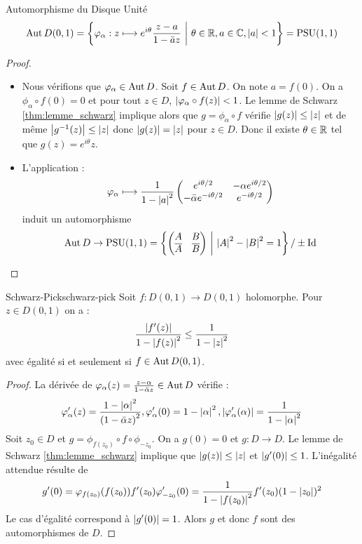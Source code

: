 \documentclass{cours}
\begin{document}
\begin{théorème}{Automorphisme du Disque Unité}{}
    \[
        \operatorname{Aut} D(0, 1) = \left\{\varphi_{\alpha} : z \longmapsto e^{i\theta}\frac{z - a}{1 - \bar{a}z}\ \middle|\ \theta \in \mathbb{R}, a \in \mathbb{C}, \left|a\right| < 1\right\} = {\rm PSU}(1, 1)
    \]
\end{théorème}
\begin{proof}
    \begin{itemize}
        \item Nous vérifions que $\varphi_{\alpha} \in \operatorname{Aut} D$. Soit $f \in \operatorname{Aut} D$. On note $a = f(0)$. On a $\phi_{\alpha} \circ f(0) = 0$ et pour tout $z \in D$, $\left|\varphi_{\alpha} \circ f(z)\right| < 1$. Le lemme de Schwarz \ref{thm:lemme_schwarz} implique alors que $g = \phi_{\alpha} \circ f$ vérifie $\left|g(z)\right| \leq \left|z\right|$ et de même $\left|g^{-1}(z)\right| \leq \left|z\right|$ donc $\left|g(z)\right| = \left|z\right|$ pour $z\in D$. Donc il existe $\theta \in \mathbb{R}$ tel que $g(z) = e^{i\theta}z$.
        \item L'application : 
        \[
            \varphi_{\alpha}\longmapsto \frac{1}{1- \left|a\right|^{2}}\begin{pmatrix}
                e^{i\theta/2} & -\alpha e^{i\theta/2} \\
                -\bar{\alpha}e^{-i\theta/2} & e^{-i\theta/2}
            \end{pmatrix}
        \]
        induit un automorphisme 
        \[
            \operatorname{Aut} D \rightarrow {\rm PSU}(1, 1) = \left\{\begin{pmatrix}
                A & B \\ \overline{A} & \overline{B}
            \end{pmatrix}\ \middle| \ \left|A\right|^{2} - \left|B\right|^{2} = 1\right\}/\pm {\rm Id}
        \]
    \end{itemize}
\end{proof}
\begin{corollaire}{Schwarz-Pick}{schwarz-pick}
    Soit $f : D(0, 1) \to D(0, 1)$ holomorphe. Pour $z \in D(0, 1)$ on a :
    \[
        \frac{\left|f'(z)\right|}{1 - \left|f(z)\right|^{2}} \leq \frac{1}{1 - \left|z\right|^{2}}
    \]
    avec égalité si et seulement si $f \in \operatorname{Aut} D(0, 1)$.
\end{corollaire}
\begin{proof}
    La dérivée de $\varphi_{\alpha}(z) = \frac{z - \alpha}{1 - \bar{\alpha}z}\in \operatorname{Aut} D$ vérifie : 
    \[
        \varphi_{\alpha}'(z) = \frac{1 - \left|\alpha\right|^2}{\left(1 - \bar{\alpha}z\right)^{2}}, \varphi_{\alpha}'(0) = 1 - \left|\alpha\right|^{2}, \left|\varphi_{\alpha}'(\alpha)\right| = \frac{1}{1 - \left|\alpha\right|^{2}}
    \]
    Soit $z_{0} \in D$ et $g = \phi_{f(z_{0})} \circ f \circ \phi_{-z_{0}}$. On a $g(0) = 0$ et $g : D\to D$. Le lemme de Schwarz \ref{thm:lemme_schwarz} implique que $\left|g(z)\right| \leq \left|z\right|$ et $\left|g'(0)\right| \leq 1$. L'inégalité attendue résulte de 
    \[
        g'(0) = \varphi_{f(z_{0})}(f(z_{0}))f'(z_{0})\varphi_{-z_{0}}'(0) = \frac{1}{1 - \left|f(z_{0})\right|^{2}}f'(z_{0})(1 - \left|z_{0}\right|)^{2}
    \]
    Le cas d'égalité correspond à $\left|g'(0)\right| = 1$. Alors $g$ et donc $f$ sont des automorphismes de $D$. 
\end{proof}
\end{document}
